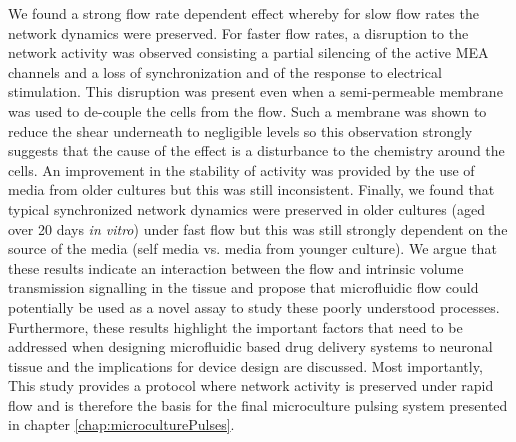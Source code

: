 We found a strong flow rate dependent effect whereby for slow flow rates the network dynamics were preserved. For faster flow rates, a disruption to the network activity was observed consisting a partial silencing of the active MEA channels and a loss of synchronization and of the response to electrical stimulation. This disruption was present even when a semi-permeable membrane was used to de-couple the cells from the flow. Such a membrane was shown to reduce the shear underneath to negligible levels \cite{morel2012concentration} so this observation strongly suggests that the cause of the effect is a disturbance to the chemistry around the cells. An improvement in the stability of activity was provided by the use of media from older cultures but this was still inconsistent. Finally, we found that typical synchronized network dynamics were preserved in older cultures (aged over 20 days \textit{in vitro}) under fast flow but this was still strongly dependent on the source of the media (self media vs. media from younger culture).  We argue that these results indicate an interaction between the flow and intrinsic volume transmission signalling in the tissue and propose that microfluidic flow could potentially be used as a novel assay to study these poorly understood processes. Furthermore, these results highlight the important factors that need to be addressed when designing microfluidic based drug delivery systems to neuronal tissue and the implications for device design are discussed. Most importantly, This study provides a protocol where network activity is preserved under rapid flow and is therefore the basis for the final microculture pulsing system presented in chapter \ref{chap:microculturePulses}.

\label{sec:crossFlow:intro}

